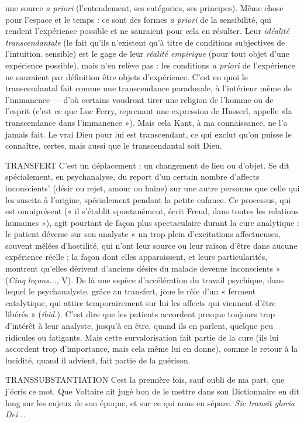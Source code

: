 une source {\it a priori} (l'entendement, ses catégories, ses principes). Même chose
pour l’espace et le temps : ce sont des formes {\it a priori} de la sensibilité, qui rendent
l'expérience possible et ne sauraient pour cela en résulter. Leur {\it idéalité transcendantale}
(le fait qu’ils n’existent qu’à titre de conditions subjectives de l'intuition.
sensible) est le gage de leur {\it réalité empirique} (pour tout objet d’une expérience
possible), mais n’en relève pas : les conditions {\it a priori} de l'expérience ne sauraient
par définition être objets d’expérience. C’est en quoi le transcendantal fait
comme une transcendance paradoxale, à l’intérieur même de l’immanence — d’où
certains voudront tirer une religion de l’homme ou de l'esprit (c’est ce que Luc
Ferry, reprenant une expression de Husserl, appelle «la transcendance dans
l’immanence »). Mais cela Kant, à ma connaissance, ne l’a jamais fait. Le vrai
Dieu pour lui est transcendant, ce qui exclut qu’on puisse le connaître, certes,
mais aussi que le transcendantal soit Dieu.

TRANSFERT C'est un déplacement : un changement de lieu ou d’objet. Se
dit spécialement, en psychanalyse, du report d’un certain
nombre d’affects inconscients’ (désir ou rejet, amour ou haine) sur une autre
personne que celle qui les suscita à l’origine, spécialement pendant la petite
enfance. Ce processus, qui est omniprésent (« il s’établit spontanément, écrit
Freud, dans toutes les relations humaines »), agit pourtant de façon plus spectaculaire
durant la cure analytique : le patient déverse sur son analyste « un trop
plein d’excitations affectueuses, souvent mélées d’hostilité, qui n’ont leur
source ou leur raison d’être dans aucune expérience réelle ; la façon dont elles
apparaissent, et leurs particularités, montrent qu’elles dérivent d’anciens désirs
du malade devenus inconscients » ({\it Cinq leçons...}, V). De là une espèce d’accélération
du travail psychique, dans lequel le psychanalyste, grâce au transfert,
joue le rôle d’un « ferment catalytique, qui attire temporairement sur lui les
affects qui viennent d’être libérés » ({\it ibid.}). C’est dire que les patients accordent
presque toujours trop d'intérêt à leur analyste, jusqu’à en être, quand ils en parlent,
quelque peu ridicules ou fatigants. Mais cette survalorisation fait partie de
la cure (ils lui accordent trop d'importance, mais cela même lui en donne),
comme le retour à la lucidité, quand il advient, fait partie de la guérison.

TRANSSUBSTANTIATION Cest la première fois, sauf oubli de ma part,
que j'écris ce mot. Que Voltaire ait jugé bon
de le mettre dans son Dictionnaire en dit long sur les enjeux de son époque, et
sur ce qui nous en sépare. {\it Sic transit gloria Dei...}

